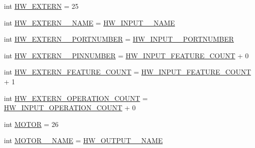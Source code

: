 \begin{DoxyCompactItemize}
\item 
int \hyperlink{interfaceshootingmachineemfmodel_1_1_shootingmachineemfmodel_package_a58063da7516b27741575dfd0ca3badff}{H\-W\-\_\-\-E\-X\-T\-E\-R\-N} = 25
\item 
int \hyperlink{interfaceshootingmachineemfmodel_1_1_shootingmachineemfmodel_package_ac5a4093023cc1e99970cb1c2e25e6fd1}{H\-W\-\_\-\-E\-X\-T\-E\-R\-N\-\_\-\-\_\-\-N\-A\-M\-E} = \hyperlink{interfaceshootingmachineemfmodel_1_1_shootingmachineemfmodel_package_aca3df42c3daea63181ee2a2aa5ed1fac}{H\-W\-\_\-\-I\-N\-P\-U\-T\-\_\-\-\_\-\-N\-A\-M\-E}
\item 
int \hyperlink{interfaceshootingmachineemfmodel_1_1_shootingmachineemfmodel_package_a530aa534b9c5ae08f03cac6002c6b728}{H\-W\-\_\-\-E\-X\-T\-E\-R\-N\-\_\-\-\_\-\-P\-O\-R\-T\-N\-U\-M\-B\-E\-R} = \hyperlink{interfaceshootingmachineemfmodel_1_1_shootingmachineemfmodel_package_ac54ab200e6b01aa749998ba59d67d36b}{H\-W\-\_\-\-I\-N\-P\-U\-T\-\_\-\-\_\-\-P\-O\-R\-T\-N\-U\-M\-B\-E\-R}
\item 
int \hyperlink{interfaceshootingmachineemfmodel_1_1_shootingmachineemfmodel_package_a9246025f6024796c44d54f6b4ac9533f}{H\-W\-\_\-\-E\-X\-T\-E\-R\-N\-\_\-\-\_\-\-P\-I\-N\-N\-U\-M\-B\-E\-R} = \hyperlink{interfaceshootingmachineemfmodel_1_1_shootingmachineemfmodel_package_a535000a6deb669d11da173c3d44815a2}{H\-W\-\_\-\-I\-N\-P\-U\-T\-\_\-\-F\-E\-A\-T\-U\-R\-E\-\_\-\-C\-O\-U\-N\-T} + 0
\item 
int \hyperlink{interfaceshootingmachineemfmodel_1_1_shootingmachineemfmodel_package_a4814c4e8a245ab5d9c7ca95d2268c71f}{H\-W\-\_\-\-E\-X\-T\-E\-R\-N\-\_\-\-F\-E\-A\-T\-U\-R\-E\-\_\-\-C\-O\-U\-N\-T} = \hyperlink{interfaceshootingmachineemfmodel_1_1_shootingmachineemfmodel_package_a535000a6deb669d11da173c3d44815a2}{H\-W\-\_\-\-I\-N\-P\-U\-T\-\_\-\-F\-E\-A\-T\-U\-R\-E\-\_\-\-C\-O\-U\-N\-T} + 1
\item 
int \hyperlink{interfaceshootingmachineemfmodel_1_1_shootingmachineemfmodel_package_a509c88e538f3bdfaec8ece9d4893b897}{H\-W\-\_\-\-E\-X\-T\-E\-R\-N\-\_\-\-O\-P\-E\-R\-A\-T\-I\-O\-N\-\_\-\-C\-O\-U\-N\-T} = \hyperlink{interfaceshootingmachineemfmodel_1_1_shootingmachineemfmodel_package_af19839a18788f1df9c7076b1f331b660}{H\-W\-\_\-\-I\-N\-P\-U\-T\-\_\-\-O\-P\-E\-R\-A\-T\-I\-O\-N\-\_\-\-C\-O\-U\-N\-T} + 0
\item 
int \hyperlink{interfaceshootingmachineemfmodel_1_1_shootingmachineemfmodel_package_a9144b6eba68be5a47fdd021422d73dbd}{M\-O\-T\-O\-R} = 26
\item 
int \hyperlink{interfaceshootingmachineemfmodel_1_1_shootingmachineemfmodel_package_a0a00df33c791b334924d8650e4c3a8bb}{M\-O\-T\-O\-R\-\_\-\-\_\-\-N\-A\-M\-E} = \hyperlink{interfaceshootingmachineemfmodel_1_1_shootingmachineemfmodel_package_a82c44c284e4ef61163abe3704089bfad}{H\-W\-\_\-\-O\-U\-T\-P\-U\-T\-\_\-\-\_\-\-N\-A\-M\-E}

\end{DoxyCompactItemize}
